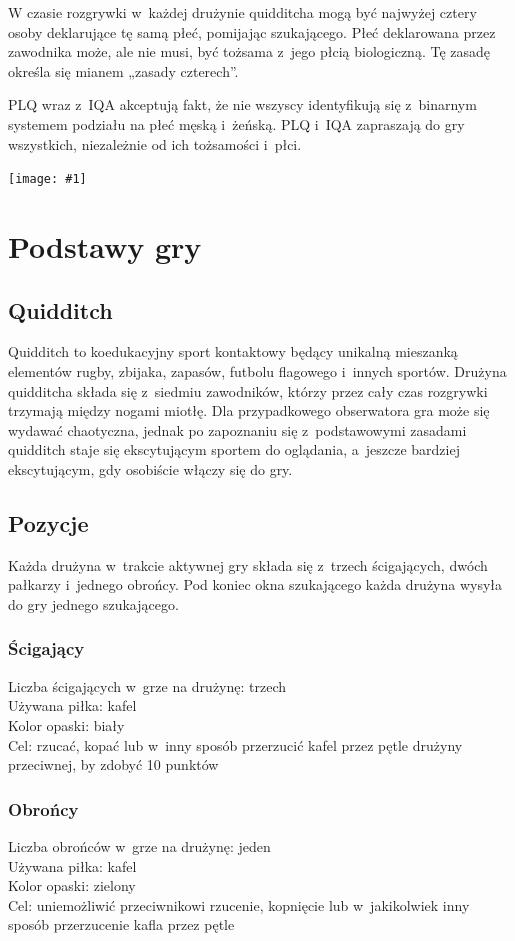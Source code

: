 \documentclass[12pt,a4paper]{article}
\newcommand\image[2]{
	\newgeometry{left=0cm,top=#2}
	\texttt{[image: \#1]}
	\restoregeometry
}
\begin{document}
W czasie rozgrywki w~każdej drużynie quidditcha mogą być najwyżej cztery
osoby deklarujące tę samą płeć, pomijając szukającego. Płeć deklarowana
przez zawodnika może, ale nie musi, być tożsama z~jego płcią
biologiczną. Tę zasadę określa się mianem „zasady czterech''.

PLQ wraz z~IQA akceptują fakt, że nie wszyscy identyfikują się z~binarnym systemem podziału na płeć męską i~żeńską. PLQ i~IQA zapraszają
do gry wszystkich, niezależnie od ich tożsamości i~płci.

\image{team_poland}{6cm}

\pagebreak
\section{Podstawy gry}

\subsection{Quidditch}

Quidditch to koedukacyjny sport kontaktowy będący unikalną mieszanką
elementów rugby, zbijaka, zapasów, futbolu flagowego i~innych sportów.
Drużyna quidditcha składa się z~siedmiu zawodników, którzy przez cały
czas rozgrywki trzymają między nogami miotłę. Dla przypadkowego
obserwatora gra może się wydawać chaotyczna, jednak po zapoznaniu się z~podstawowymi zasadami quidditch staje się ekscytującym sportem do
oglądania, a~jeszcze bardziej ekscytującym, gdy osobiście włączy się do
gry.

\subsection{Pozycje}
Każda drużyna w~trakcie aktywnej gry składa się z~trzech ścigających,
dwóch pałkarzy i~jednego obrońcy. Pod koniec okna szukającego każda
drużyna wysyła do gry jednego szukającego.

\subsubsection{Ścigający}
Liczba ścigających w~grze na drużynę: trzech \\
Używana piłka: kafel \\
Kolor opaski: biały \\
Cel: rzucać, kopać lub w~inny sposób przerzucić kafel przez pętle
drużyny przeciwnej, by zdobyć 10 punktów

\subsubsection{Obrońcy}
Liczba obrońców w~grze na drużynę: jeden \\
Używana piłka: kafel \\
Kolor opaski: zielony \\
Cel: uniemożliwić przeciwnikowi rzucenie, kopnięcie lub w~jakikolwiek inny sposób przerzucenie kafla przez pętle
\end{document}

